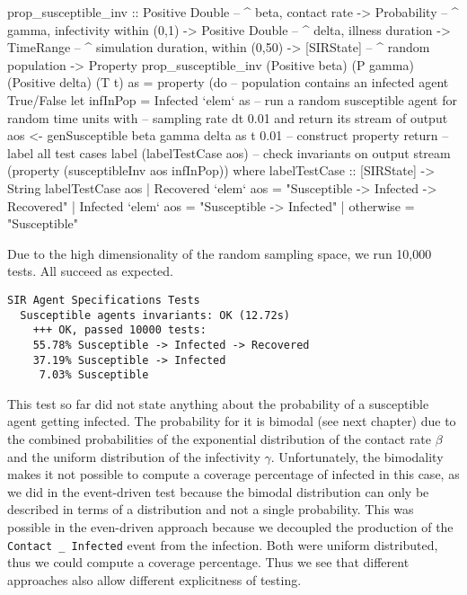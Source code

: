 \begin{HaskellCode}
prop_susceptible_inv :: Positive Double -- ^ beta, contact rate
                     -> Probability     -- ^ gamma, infectivity within (0,1)
                     -> Positive Double -- ^ delta, illness duration
                     -> TimeRange       -- ^ simulation duration, within (0,50)
                     -> [SIRState]      -- ^ random population
                     -> Property
prop_susceptible_inv
      (Positive beta) (P gamma) (Positive delta) (T t) as = property (do  
    -- population contains an infected agent True/False
    let infInPop = Infected `elem` as
    -- run a random susceptible agent for random time units with 
    -- sampling rate dt 0.01 and return its stream of output
    aos <- genSusceptible beta gamma delta as t 0.01
    -- construct property
    return 
        -- label all test cases
        label (labelTestCase aos) 
        -- check invariants on output stream
        (property (susceptibleInv aos infInPop))
  where
    labelTestCase :: [SIRState] -> String
    labelTestCase aos
      | Recovered `elem` aos = "Susceptible -> Infected -> Recovered"
      | Infected `elem` aos  = "Susceptible -> Infected"
      | otherwise            = "Susceptible"
\end{HaskellCode}

Due to the high dimensionality of the random sampling space, we run 10,000 tests. All succeed as expected.

\begin{verbatim}
SIR Agent Specifications Tests
  Susceptible agents invariants: OK (12.72s)
    +++ OK, passed 10000 tests:
    55.78% Susceptible -> Infected -> Recovered
    37.19% Susceptible -> Infected
     7.03% Susceptible
\end{verbatim}

This test so far did not state anything about the probability of a susceptible agent getting infected. The probability for it is bimodal (see next chapter) due to the combined probabilities of the exponential distribution of the contact rate $\beta$ and the uniform distribution of the infectivity $\gamma$. Unfortunately, the bimodality makes it not possible to compute a coverage percentage of infected in this case, as we did in the event-driven test because the bimodal distribution can only be described in terms of a distribution and not a single probability. This was possible in the even-driven approach because we decoupled the production of the \texttt{Contact \_ Infected} event from the infection. Both were uniform distributed, thus we could compute a coverage percentage. Thus we see that different approaches also allow different explicitness of testing.

